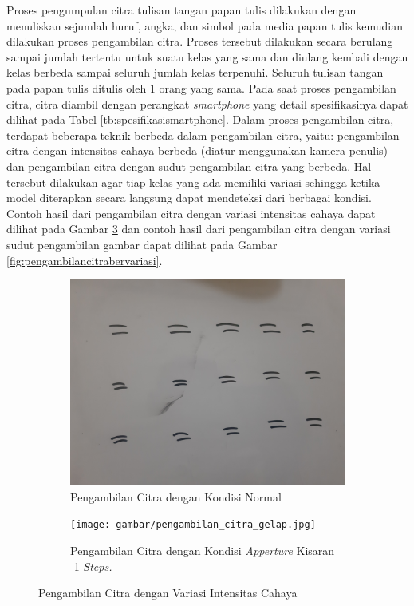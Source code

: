 Proses pengumpulan citra tulisan tangan papan tulis dilakukan dengan menuliskan sejumlah huruf, angka, dan simbol pada media papan tulis kemudian dilakukan proses pengambilan citra. Proses tersebut dilakukan secara berulang sampai jumlah tertentu untuk suatu kelas yang sama dan diulang kembali dengan kelas berbeda sampai seluruh jumlah kelas terpenuhi. Seluruh tulisan tangan pada papan tulis ditulis oleh 1 orang yang sama. Pada saat proses pengambilan citra, citra diambil dengan perangkat \textit{smartphone} yang detail spesifikasinya dapat dilihat pada Tabel \ref*{tb:spesifikasismartphone}. Dalam proses pengambilan citra, terdapat beberapa teknik berbeda dalam pengambilan citra, yaitu: pengambilan citra dengan intensitas cahaya berbeda (diatur menggunakan kamera penulis) dan pengambilan citra dengan sudut pengambilan citra yang berbeda. Hal tersebut dilakukan agar tiap kelas yang ada memiliki variasi sehingga ketika model diterapkan secara langsung dapat mendeteksi dari berbagai kondisi. Contoh hasil dari pengambilan citra dengan variasi intensitas cahaya dapat dilihat pada Gambar \ref{fig:intensitascitrabervariasi} dan contoh hasil dari pengambilan citra dengan variasi sudut pengambilan gambar dapat dilihat pada Gambar \ref*{fig:pengambilancitrabervariasi}.  \par

\begin{figure}[H]
  \begin{subfigure}{.5\textwidth}
    \centering
    \captionsetup{width=.8\linewidth}
    \includegraphics[width=.85\linewidth]{gambar/pengambilan_citra_terang.jpg}
    \caption{Pengambilan Citra dengan Kondisi Normal}
    \label{fig:citraterang}
  \end{subfigure}%
  \begin{subfigure}{.5\textwidth}
    \centering
    \captionsetup{width=.8\linewidth}
    \texttt{[image: gambar/pengambilan\_citra\_gelap.jpg]}
    \caption{Pengambilan Citra dengan Kondisi \textit{Apperture} Kisaran -1 \textit{Steps.}}
    \label{fig:citragelap}
  \end{subfigure}
  \caption{Pengambilan Citra dengan Variasi Intensitas Cahaya}
  \label{fig:intensitascitrabervariasi}
\end{figure}

